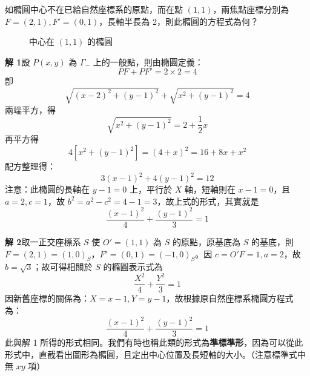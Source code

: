 \begin{example}
如橢圓中心不在已給自然座標系的原點，而在點 $(1,1)$，兩焦點座標分別為 $F=(2,1), F'=(0,1)$，長軸半長為 2，則此橢圓的方程式為何？

\begin{figure}[htbp]
\centering
{}
\caption{中心在 $(1,1)$ 的橢圓}
\label{fig:b4-3-4}
\end{figure}

\textbf{解 1}\quad 設 $P(x,y)$ 為 $\Gamma_-$ 上的一般點，則由橢圓定義：
\[ PF + PF' = 2 \times 2 = 4 \]
卽
\[ \sqrt{(x-2)^2 + (y-1)^2} + \sqrt{x^2 + (y-1)^2} = 4 \]
兩端平方，得
\[ \sqrt{x^2 + (y-1)^2} = 2 + \frac{1}{2}x \]
再平方得
\[ 4[x^2 + (y-1)^2] = (4 + x)^2 = 16 + 8x + x^2 \]
配方整理得：
\[ 3(x-1)^2 + 4(y-1)^2 = 12 \]
注意：此橢圓的長軸在 $y-1=0$ 上，平行於 $X$ 軸，短軸則在 $x-1=0$，且 $a=2, c=1$，故 $b^2 = a^2 - c^2 = 4-1 = 3$，故上式的形式，其實就是
\[ \frac{(x-1)^2}{4} + \frac{(y-1)^2}{3} = 1 \]

\textbf{解 2}\quad 取一正交座標系 $S$ 使 $O'=(1,1)$ 為 $S$ 的原點，原基底為 $S$ 的基底，則 $F=(2,1) = (1,0)_S$，$F'=(0,1) = (-1,0)_S$。因 $c = \overline{O'F} = 1, a = 2$，故 $b = \sqrt{3}$；故可得相關於 $S$ 的橢圓表示式為
\[ \frac{X^2}{4} + \frac{Y^2}{3} = 1 \]
因新舊座標的關係為：$X = x-1, Y = y-1$，故根據原自然座標系橢圓方程式為：
\[ \frac{(x-1)^2}{4} + \frac{(y-1)^2}{3} = 1 \]
此與解 1 所得的形式相同。我們有時也稱此類的形式為\textbf{準標準形}，因為可以從此形式中，直截看出圖形為橢圓，且定出中心位置及長短軸的大小。（注意標準式中無 $xy$ 項）
\end{example}

